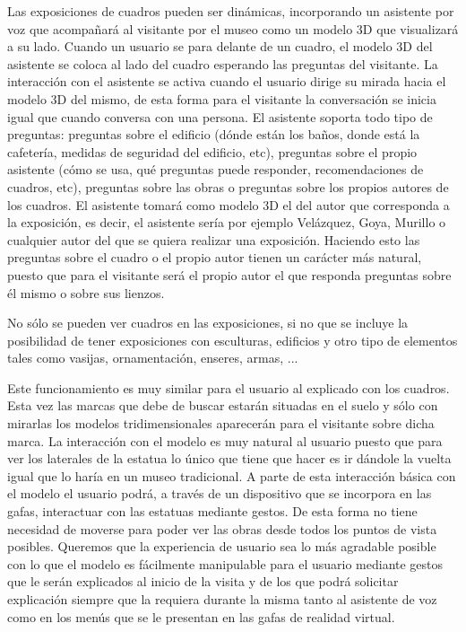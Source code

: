 \documentclass[a4paper,11pt]{article}
\begin{document}
\vspace{10px}

Las exposiciones de cuadros pueden ser dinámicas, incorporando un asistente por voz que acompañará al visitante por el museo como un modelo 3D que visualizará a su lado. Cuando un usuario se para delante de un cuadro, el modelo 3D del asistente se coloca al lado del cuadro esperando las preguntas del visitante. La interacción con el asistente se activa cuando el usuario dirige su mirada hacia el modelo 3D del mismo, de esta forma para el visitante la conversación se inicia igual que cuando conversa con una persona. El asistente soporta todo tipo de preguntas: preguntas sobre el edificio (dónde están los baños, donde está la cafetería, medidas de seguridad del edificio, etc), preguntas sobre el propio asistente (cómo se usa, qué preguntas puede responder, recomendaciones de cuadros,  etc), preguntas sobre las obras o preguntas sobre los propios autores de los cuadros. El asistente tomará como modelo 3D el del autor que corresponda a la exposición, es decir, el asistente sería por ejemplo Velázquez, Goya, Murillo o cualquier autor del que se quiera realizar una exposición. Haciendo esto las preguntas sobre el cuadro o el propio autor tienen un carácter más natural, puesto que para el visitante será el propio autor el que responda preguntas sobre él mismo o sobre sus lienzos.

\vspace{10px}

No sólo se pueden ver cuadros en las exposiciones, si no que se incluye la posibilidad de tener exposiciones con esculturas, edificios y otro tipo de elementos tales como vasijas, ornamentación, enseres, armas, ...

\vspace{10px}

Este funcionamiento es muy similar para el usuario al explicado con los cuadros. Esta vez las marcas que debe de buscar estarán situadas en el suelo y sólo con mirarlas los modelos tridimensionales aparecerán para el visitante sobre dicha marca. La interacción con el modelo es muy natural al usuario puesto que para ver los laterales de la estatua lo único que tiene que hacer es ir dándole la vuelta igual que lo haría en un museo tradicional. A parte de esta interacción básica con el modelo el usuario podrá, a través de un dispositivo que se incorpora en las gafas, interactuar con las estatuas mediante gestos. De esta forma no tiene necesidad de moverse para poder ver las obras desde todos los puntos de vista posibles. Queremos que la experiencia de usuario sea lo más agradable posible con lo que el modelo es fácilmente manipulable para el usuario mediante gestos que le serán explicados al inicio de la visita y de los que podrá solicitar explicación siempre que la requiera durante la misma tanto al asistente de voz como en los menús que se le presentan en las gafas de realidad virtual.
\end{document}
